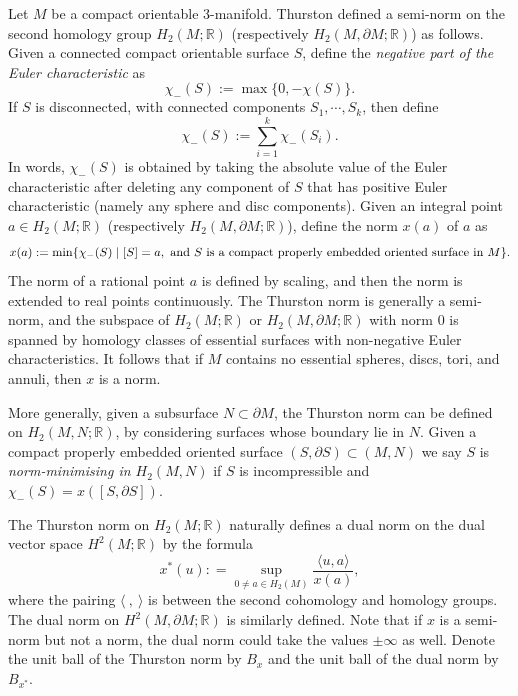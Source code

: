 \documentclass[11pt]{amsart}
\theoremstyle{remark}
\theoremstyle{definition}
\begin{document}
	Let $M$ be a compact orientable 3-manifold. Thurston \cite{thurston1986norm} defined a semi-norm on the second homology group $H_2(M ; \mathbb{R})$ (respectively $H_2(M , \partial M ; \mathbb{R})$) as follows. Given a connected compact orientable surface $S$, define the \emph{negative part of the Euler characteristic} as 
	\[ \chi_-(S) := \max \{ 0 , - \chi(S) \}. \]
	If $S$ is disconnected, with connected components $S_1, \cdots, S_k$, then define 
	\[ \chi_-(S) := \sum_{i=1}^{k} \chi_-(S_i). \]
	In words, $\chi_-(S)$ is obtained by taking the absolute value of the Euler characteristic after deleting any component of $S$ that has positive Euler characteristic (namely any sphere and disc components). Given an integral point $a \in H_2(M ; \mathbb{R})$ (respectively $H_2(M , \partial M ; \mathbb{R})$), define the norm $x(a)$ of $a$ as 
	\[ x(a) := \min \{ \chi_-(S) \hspace{1mm} | \hspace{1mm} [S]= a, \text{ and }S \text{ is a compact properly embedded oriented surface in } M\}. \]
	The norm of a rational point $a$ is defined by scaling, and then the norm is extended to real points continuously. The Thurston norm is generally a semi-norm, and the subspace of $H_2(M ; \mathbb{R})$ or $H_2(M , \partial M ; \mathbb{R})$ with norm $0$ is spanned by homology classes of essential surfaces with non-negative Euler characteristics. It follows that if $M$ contains no essential spheres, discs, tori, and annuli, then $x$ is a norm. 
	
	More generally, given a subsurface $N \subset \partial M$, the Thurston norm can be defined on $H_2(M, N; \mathbb{R})$, by considering surfaces whose boundary lie in $N$. Given a compact properly embedded oriented surface $(S, \partial S) \subset (M, N)$ we say $S$ is \emph{norm-minimising in $H_2(M, N)$} if $S$ is incompressible and $\chi_-(S) = x([S, \partial S])$.
	
	The Thurston norm on $H_2(M ; \mathbb{R})$ naturally defines a dual norm on the dual vector space $H^2(M ; \mathbb{R})$ by the formula 
	\[ x^*(u) : = \sup_{0 \neq a \in H_2(M)} \frac{ \langle u , a \rangle}{x(a)},  \]
	where the pairing $\langle \ , \ \rangle $ is between the second cohomology and homology groups. The dual norm on $H^2(M , \partial M ; \mathbb{R})$ is similarly defined. Note that if $x$ is a semi-norm but not a norm, the dual norm could take the values $\pm \infty$ as well. Denote the unit ball of the Thurston norm by $B_{x}$ and the unit ball of the dual norm by $B_{x^*}$. 
	
\end{document}

